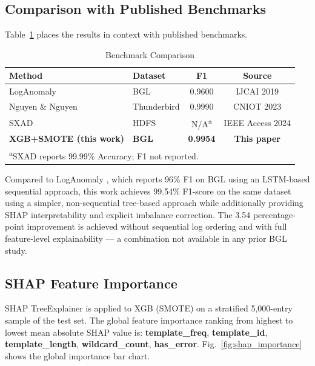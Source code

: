 \documentclass[conference]{IEEEtran}
\begin{document}
\subsection{Comparison with Published Benchmarks}

Table~\ref{tab:benchmark} places the results in context with published
benchmarks.

\begin{table}[h]
\caption{Benchmark Comparison}
\label{tab:benchmark}
\centering
\small
\begin{tabular}{llcc}
\toprule
\textbf{Method} & \textbf{Dataset} & \textbf{F1} & \textbf{Source} \\
\midrule
LogAnomaly \cite{meng2019loganomaly} & BGL & 0.9600 & IJCAI 2019 \\
Nguyen \& Nguyen \cite{nguyen2023}   & Thunderbird & 0.9990 & CNIOT 2023 \\
SXAD \cite{alam2024sxad}             & HDFS & N/A\textsuperscript{a} & IEEE Access 2024 \\
\textbf{XGB+SMOTE (this work)}       & \textbf{BGL} & \textbf{0.9954} & \textbf{This paper} \\
\bottomrule
\multicolumn{4}{l}{\footnotesize \textsuperscript{a}SXAD reports 99.99\% Accuracy; F1 not reported.}\\
\end{tabular}
\end{table}

Compared to LogAnomaly \cite{meng2019loganomaly}, which reports 96\% F1 on
BGL using an LSTM-based sequential approach, this work achieves 99.54\%
F1-score on the same dataset using a simpler, non-sequential tree-based
approach while additionally providing SHAP interpretability and explicit
imbalance correction. The 3.54 percentage-point improvement is achieved
without sequential log ordering and with full feature-level explainability
--- a combination not available in any prior BGL study.

\subsection{SHAP Feature Importance}

SHAP TreeExplainer is applied to XGB (SMOTE) on a stratified 5{,}000-entry
sample of the test set. The global feature importance ranking from highest
to lowest mean absolute SHAP value is: \textbf{template\_freq},
\textbf{template\_id}, \textbf{template\_length}, \textbf{wildcard\_count},
\textbf{has\_error}. Fig.~\ref{fig:shap_importance} shows the global
importance bar chart.
\end{document}
